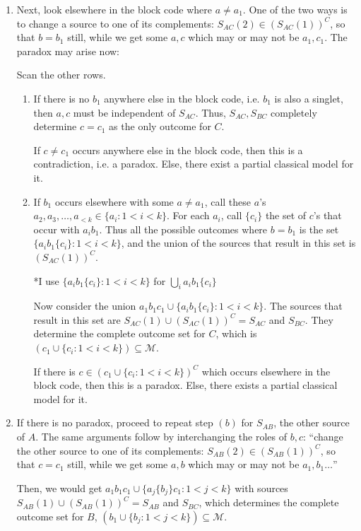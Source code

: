 \documentclass[12pt]{article}  %
\begin{document}
\begin{enumerate}
\begin{enumerate}
\item Next, look elsewhere in the block code where $a \neq a_1$. One of the two ways is to change a source to one of its complements: $S_{AC}(2) \in (S_{AC}(1))^C$, so that $b=b_1$ still, while we get some $a,c$ which may or may not be $a_1,c_1$. The paradox may arise now: 

Scan the other rows. 

\begin{enumerate}
\item If there is no $b_1$ anywhere else in the block code, i.e. $b_1$ is also a singlet, then $a,c$ must be independent of $S_{AC}$. Thus, $S_{AC}, S_{BC}$ completely determine $c=c_1$ as the only outcome for $C$.


If $c \neq c_1$ occurs anywhere else in the block code, then this is a contradiction, i.e. a paradox. Else, there exist a partial classical model for it.


\item If $b_1$ occurs elsewhere with some $a \neq a_1$, call these $a$'s $a_2,a_3,\dots,a_{<k} \in \{ a_i : 1<i<k \}$. For each $a_i$, call $\{c_i\}$ the set of $c$'s that occur with $a_i b_1$. Thus all the possible outcomes where $b=b_1$ is the set $\{a_i b_1 \{c_i\} : 1<i<k\}$, and the union of the sources that result in this set is $(S_{AC}(1))^C$.


\centerline{\small{*I use $\{a_i b_1 \{c_i\} : 1<i<k\}$ for $\bigcup\limits_{i}a_i b_1 \{c_i\}$}}


Now consider the union $a_1 b_1 c_1 \cup \{a_i b_1 \{c_i\} : 1<i<k\}$. The sources that result in this set are $S_{AC}(1) \cup (S_{AC}(1))^C = S_{AC}$ and $S_{BC}$. They determine the complete outcome set for $C$, which is $(c_1 \cup \{c_i : 1<i<k\}) \subseteq \mathcal{M}$. 


If there is $c \in (c_1 \cup \{c_i : 1<i<k\})^C$ which occurs elsewhere in the block code, then this is a paradox. Else, there exists a partial classical model for it. 

\end{enumerate}


\item If there is no paradox, proceed to repeat step $(b)$ for $S_{AB}$, the other source of $A$. The same arguments follow by interchanging the roles of $b,c$: ``change the other source to one of its complements: $S_{AB}(2) \in (S_{AB}(1))^C$, so that $c=c_1$ still, while we get some $a,b$ which may or may not be $a_1,b_1 \dots$''


Then, we would get $a_1 b_1 c_1 \cup \{a_j \{b_j\} c_1 : 1<j<k\}$ with sources $S_{AB}(1) \cup (S_{AB}(1))^C = S_{AB}$ and $S_{BC}$, which determines the complete outcome set for $B$, $(b_1 \cup \{b_j : 1<j<k\}) \subseteq \mathcal{M}$.



\end{enumerate}
\end{enumerate}
\end{document}
